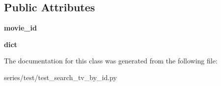 \subsection*{Public Attributes}
\begin{DoxyCompactItemize}
\item 
\mbox{\label{classseries_1_1test_1_1test__search__tv__by__id_1_1_search_tv_test_ac116facc25ee8298b3354774c2167ece}} 
{\bfseries movie\+\_\+id}
\item 
\mbox{\label{classseries_1_1test_1_1test__search__tv__by__id_1_1_search_tv_test_a08e38f80fe90c26086780854b7679734}} 
{\bfseries dict}
\end{DoxyCompactItemize}


The documentation for this class was generated from the following file\+:\begin{DoxyCompactItemize}
\item 
series/test/test\+\_\+search\+\_\+tv\+\_\+by\+\_\+id.\+py\end{DoxyCompactItemize}
